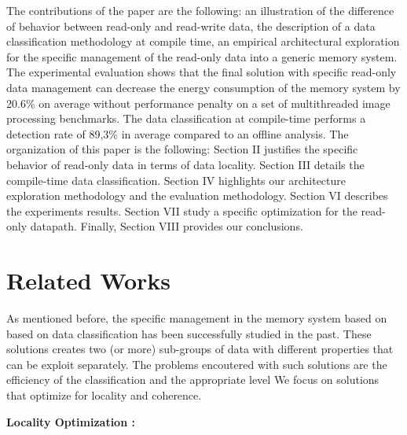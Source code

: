 \documentclass[sigconf]{acmart}
\begin{document}
The contributions of the paper are the following: an illustration of the difference of behavior between read-only and read-write data, the description of a data classification methodology at compile time, an empirical architectural exploration for the specific management of the read-only data into a generic memory system. 
The experimental evaluation shows that the final solution with specific read-only data management can decrease the energy consumption of the memory system by 20.6\% on average without performance penalty on a set of multithreaded image processing benchmarks. The data classification at compile-time performs a detection rate of 89,3\% in average compared to an offline analysis. The organization of this paper is the following: Section II justifies the specific behavior of read-only data in terms of data locality. Section III details the compile-time data classification. Section IV highlights our architecture exploration methodology and the evaluation methodology. Section VI describes the experiments results. Section VII study a specific optimization for the read-only datapath. Finally, Section VIII provides our conclusions.

\section{Related Works}

As mentioned before, the specific management in the memory system based on based on data classification has been successfully studied in the past. These solutions creates two (or more) sub-groups of data with different properties that can be exploit separately. The problems encoutered with such solutions are the efficiency of the classification and the appropriate level  We focus on solutions that optimize for locality and coherence. 

\textbf{Locality Optimization :} 
\end{document}
